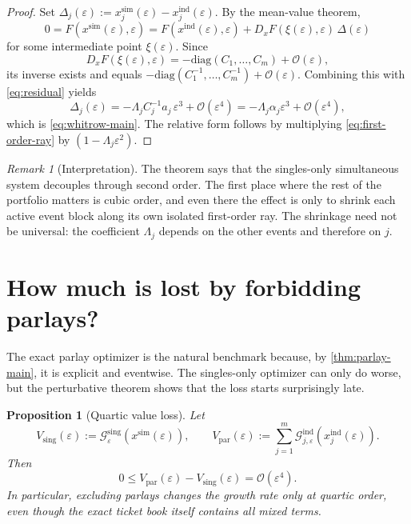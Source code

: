 \documentclass[11pt]{article}
\numberwithin{equation}{section}
\newtheorem{proposition}[theorem]{Proposition}
\theoremstyle{remark}
\newtheorem{remark}[theorem]{Remark}
\theoremstyle{definition}
\newcommand{\1}{\mathbf{1}}
\newcommand{\OO}{\mathcal{O}}
\newcommand{\eps}{\varepsilon}
\newcommand{\diag}{\mathrm{diag}}
\newcommand{\ind}{\mathrm{ind}}
\newcommand{\simu}{\mathrm{sim}}
\newcommand{\parlay}{\mathrm{par}}
\newcommand{\sing}{\mathrm{sing}}
\begin{document}
\begin{proof}
Set $\Delta_j(\eps):=x_j^{\simu}(\eps)-x_j^{\ind}(\eps)$. By the mean-value theorem,
\[
  0=F(x^{\simu}(\eps),\eps)=F(x^{\ind}(\eps),\eps)+D_xF(\xi(\eps),\eps)\,\Delta(\eps)
\]
for some intermediate point $\xi(\eps)$. Since
\[
  D_xF(\xi(\eps),\eps)=-\diag(C_1,\dots,C_m)+\OO(\eps),
\]
its inverse exists and equals $-\diag(C_1^{-1},\dots,C_m^{-1})+\OO(\eps)$. Combining this with \eqref{eq:residual} yields
\[
  \Delta_j(\eps)=-\Lambda_j C_j^{-1}a_j\,\eps^3+\OO(\eps^4)
  =-\Lambda_j\alpha_j\eps^3+\OO(\eps^4),
\]
which is \eqref{eq:whitrow-main}. The relative form follows by multiplying \eqref{eq:first-order-ray} by $(1-\Lambda_j\eps^2)$.
\end{proof}

\begin{remark}[Interpretation]
The theorem says that the singles-only simultaneous system decouples through second order. The first place where the rest of the portfolio matters is cubic order, and even there the effect is only to shrink each active event block along its own isolated first-order ray. The shrinkage need not be universal: the coefficient $\Lambda_j$ depends on the other events and therefore on $j$.
\end{remark}

\section{How much is lost by forbidding parlays?}
The exact parlay optimizer is the natural benchmark because, by \cref{thm:parlay-main}, it is explicit and eventwise. The singles-only optimizer can only do worse, but the perturbative theorem shows that the loss starts surprisingly late.

\begin{proposition}[Quartic value loss]
\label{prop:quartic-loss}
Let
\[
  V_\sing(\eps):=\mathcal G_{\eps}^{\sing}(x^{\simu}(\eps)),
  \qquad
  V_\parlay(\eps):=\sum_{j=1}^m \mathcal G_{j,\eps}^{\ind}(x_j^{\ind}(\eps)).
\]
Then
\begin{equation}
  0\le V_\parlay(\eps)-V_\sing(\eps)=\OO(\eps^4).
  \label{eq:quartic-loss}
\end{equation}
In particular, excluding parlays changes the growth rate only at quartic order, even though the exact ticket book itself contains all mixed terms.
\end{proposition}
\end{document}

